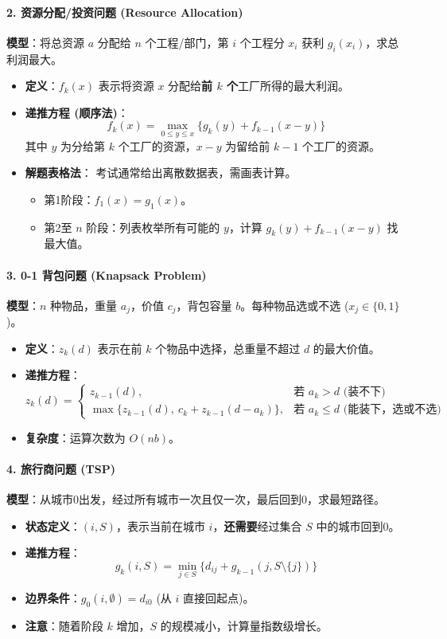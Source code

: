 \documentclass[a4paper,12pt]{ctexart} %
\begin{document}
	\paragraph{2. 资源分配/投资问题 (Resource Allocation)}
	\textbf{模型}：将总资源 $a$ 分配给 $n$ 个工程/部门，第 $i$ 个工程分 $x_i$ 获利 $g_i(x_i)$，求总利润最大。
	\begin{itemize}
		\item \textbf{定义}：$f_k(x)$ 表示将资源 $x$ 分配给\textbf{前 $k$ 个}工厂所得的最大利润。
		\item \textbf{递推方程 (顺序法)}：
		\[
		f_k(x) = \max_{0 \le y \le x} \{ g_k(y) + f_{k-1}(x-y) \}
		\]
		其中 $y$ 为分给第 $k$ 个工厂的资源，$x-y$ 为留给前 $k-1$ 个工厂的资源。
		\item \textbf{解题表格法}：
		考试通常给出离散数据表，需画表计算。
		\begin{itemize}
			\item 第1阶段：$f_1(x) = g_1(x)$。
			\item 第2至 $n$ 阶段：列表枚举所有可能的 $y$，计算 $g_k(y) + f_{k-1}(x-y)$ 找最大值。
		\end{itemize}
	\end{itemize}
	
	\paragraph{3. 0-1 背包问题 (Knapsack Problem)}
	\textbf{模型}：$n$ 种物品，重量 $a_j$，价值 $c_j$，背包容量 $b$。每种物品选或不选 ($x_j \in \{0,1\}$)。
	\begin{itemize}
		\item \textbf{定义}：$z_k(d)$ 表示在前 $k$ 个物品中选择，总重量不超过 $d$ 的最大价值。
		\item \textbf{递推方程}：
		\[
		z_k(d) = 
		\begin{cases} 
			z_{k-1}(d), & \text{若 } a_k > d \text{ (装不下)} \\
			\max \{ z_{k-1}(d), \ c_k + z_{k-1}(d - a_k) \}, & \text{若 } a_k \le d \text{ (能装下，选或不选)}
		\end{cases}
		\]
		\item \textbf{复杂度}：运算次数为 $O(nb)$。
	\end{itemize}
	
	\paragraph{4. 旅行商问题 (TSP)}
	\textbf{模型}：从城市0出发，经过所有城市一次且仅一次，最后回到0，求最短路径。
	\begin{itemize}
		\item \textbf{状态定义}：$(i, S)$，表示当前在城市 $i$，\textbf{还需要}经过集合 $S$ 中的城市回到0。
		\item \textbf{递推方程}：
		\[
		g_k(i, S) = \min_{j \in S} \{ d_{ij} + g_{k-1}(j, S \setminus \{j\}) \}
		\]
		\item \textbf{边界条件}：$g_0(i, \emptyset) = d_{i0}$ (从 $i$ 直接回起点)。
		\item \textbf{注意}：随着阶段 $k$ 增加，$S$ 的规模减小，计算量指数级增长。
	\end{itemize}
	
\end{document}

